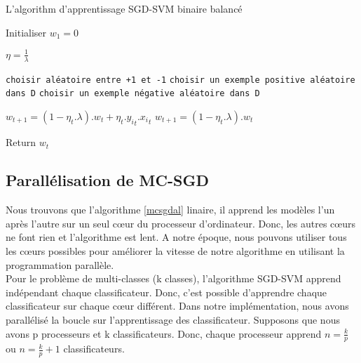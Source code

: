 \begin{algorithm}[H]
\caption{L'algorithm d'apprentissage SGD-SVM binaire balancé}\label{balance-sgdal}
\begin{algorithmic}[1]

\State Initialiser $w_1 = 0$


\State $\eta = \frac{1}{\lambda}$

\State \texttt{choisir aléatoire entre +1 et -1}
\State \texttt{choisir un exemple positive aléatoire dans D}
\Else
\State \texttt{choisir un exemple négative aléatoire dans D}
\EndIf

\State $w_{t+1} = (1 - \eta_t.\lambda).w_t + \eta_t.{y_i}_t.{x_i}_t$
\Else
\State $w_{t+1} = (1 - \eta_t.\lambda).w_t$
\EndIf
\EndFor

\EndFor

\State Return $w_{t}$

\EndProcedure
\end{algorithmic}
\end{algorithm}




\subsection{Parallélisation de MC-SGD}
Nous trouvons que l'algorithme \ref{mcsgdal} linaire, il apprend les modèles l'un après l'autre sur un seul cœur du processeur d'ordinateur. Donc, les autres cœurs ne font rien et l'algorithme est lent. A notre époque, nous pouvons utiliser tous les cœurs possibles pour améliorer la vitesse de notre algorithme en utilisant la programmation parallèle.\\

Pour le problème de multi-classes (k classes), l'algorithme SGD-SVM apprend indépendant chaque classificateur. Donc, c'est possible d'apprendre chaque classificateur sur chaque cœur différent. Dans notre implémentation, nous avons parallélisé la boucle sur l'apprentissage des classificateur. Supposons que nous avons p processeurs et k classificateurs. Donc, chaque processeur apprend $n = \frac{k}{p}$ ou $n = \frac{k}{p} + 1$ classificateurs.

